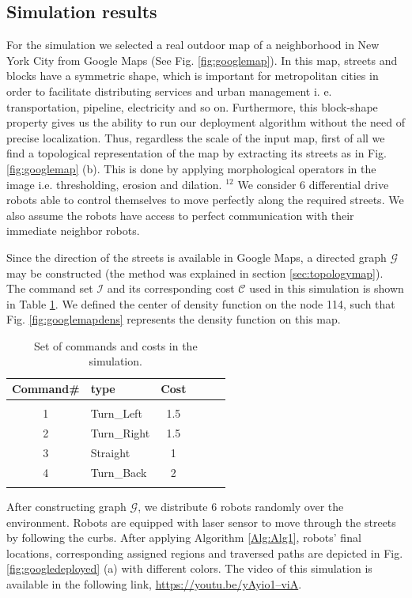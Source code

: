 \documentclass[smallcondensed]{svjour3}
\begin{document}
\subsection{Simulation results}
%
For the simulation we selected a real outdoor map of a neighborhood in New York City from Google Maps (See Fig. \ref{fig:googlemap}). In this map, streets and blocks have a symmetric shape, which is important for metropolitan cities in order to facilitate distributing services and urban management i. e. transportation, pipeline, electricity and so on. Furthermore, this block-shape property gives us the ability to run our deployment algorithm without the need of precise localization. Thus, regardless the scale of the input map, first of all we find a topological representation of the map by extracting its streets as in Fig. \ref{fig:googlemap} (b). This is done by applying morphological operators in the image i.e. thresholding, erosion and dilation. {\color{blue}$^{12}$ We consider 6 differential drive robots able to control themselves to move perfectly along the required streets. We also assume the robots have access to perfect communication with their immediate neighbor robots.}

%
Since the direction of the streets is available in Google Maps, a directed graph $\mathcal G$ may be constructed (the method was explained in section \ref{sec:topologymap}). The command set $\mathcal{I}$ and its corresponding cost $\mathcal{C}$ used in this simulation is shown in Table \ref{tbl:commandsets}. We defined the center of density function on the node 114, such that Fig.
\ref{fig:googlemapdens} represents the density function on this map.

\begin{table}[t]
\centering
\caption{Set of commands and costs in the simulation.}
\label{tbl:commandsets}
\begin{tabular}{cm{1.5cm}cm{1.9cm}cm{1.8cm}}
Command\#  & type  & Cost    \\
\hline\\
1 & Turn\_Left &  1.5 \\
2 & Turn\_Right& 1.5\\
3 & Straight &  1\\
4 & Turn\_Back & 2\\
\hline\\
\end{tabular}
\end{table}

After constructing graph $\mathcal G$, we distribute 6 robots randomly over the environment. Robots are equipped with laser sensor to move through the streets by following the curbs. 
%
After applying Algorithm \ref{Alg:Alg1}, robots' final locations, corresponding assigned regions and traversed paths are depicted in Fig. \ref{fig:googledeployed} (a) with different colors. The video of this simulation is available in the following link, \href{https://youtu.be/yAyio1--viA}{https://youtu.be/yAyio1--viA}.
\end{document}
